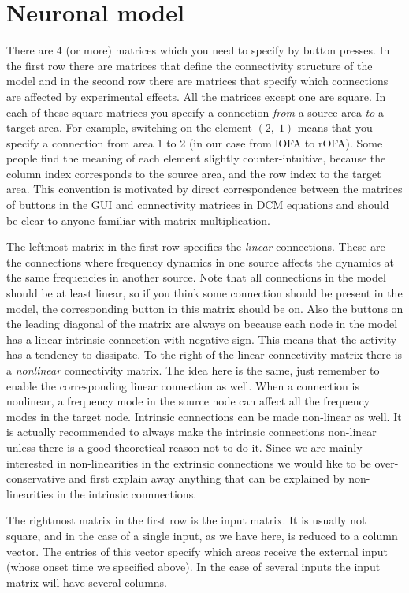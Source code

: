 \section{Neuronal model}
There are 4 (or more) matrices which you need to specify by button presses. In the first row there are matrices that define the connectivity structure of the model and in the second row there are matrices that specify which connections are affected by experimental effects. All the matrices except one are square. In each of these square matrices you specify a connection \textit{from} a source area \textit{to} a target area. For example, switching on the element $(2,\;1)$ means that you specify a connection from area 1 to 2 (in our case from lOFA to rOFA). Some people find the meaning of each element slightly counter-intuitive, because the column index corresponds to the source area, and the row index to the target area. This convention is motivated by direct correspondence between the matrices of buttons in the GUI and connectivity matrices in DCM equations and should be clear to anyone familiar with matrix multiplication.

The leftmost matrix in the first row specifies the \textit{linear} connections. These are the connections where frequency dynamics in one source affects the dynamics at the same frequencies in another source. Note that all connections in the model should be at least linear, so if you think some connection should be present in the model, the corresponding button in this matrix should be on. Also the buttons on the leading diagonal of the matrix are always on because each node in the model has a linear  intrinsic connection with negative sign. This means that the activity has a tendency to dissipate. To the right of the linear connectivity matrix there is a \textit{nonlinear} connectivity matrix. The idea here is the same, just remember to enable the corresponding linear connection as well. When a connection is nonlinear, a frequency mode in the source node can affect all the frequency modes in the target node. Intrinsic connections can be made non-linear as well. It is actually recommended to always make the intrinsic connections non-linear unless there is a good theoretical reason not to do it. Since we are mainly interested in non-linearities in the extrinsic connections we would like to be over-conservative and first explain away anything that can be explained by non-linearities in the intrinsic connnections.

The rightmost matrix in the first row is the input matrix. It is usually not square, and in the case of a single input, as we have here, is reduced to a column vector. The entries of this vector specify which areas receive the external input (whose onset time we specified above). In the case of several inputs the input matrix will have several columns.

